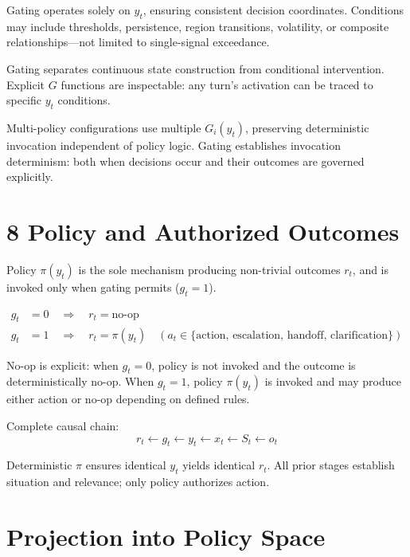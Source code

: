 \documentclass[11pt]{article}
\begin{document}
Gating operates solely on $y_t$, ensuring consistent decision coordinates. Conditions may include thresholds, persistence, region transitions, volatility, or composite relationships---not limited to single-signal exceedance.

Gating separates continuous state construction from conditional intervention. Explicit $G$ functions are inspectable: any turn's activation can be traced to specific $y_t$ conditions.

Multi-policy configurations use multiple $G_i(y_t)$, preserving deterministic invocation independent of policy logic. Gating establishes invocation determinism: both when decisions occur and their outcomes are governed explicitly.

\section*{8 \quad Policy and Authorized Outcomes}
\label{sec:policy}

Policy $\pi(y_t)$ is the sole mechanism producing non-trivial outcomes $r_t$, and is invoked only when gating permits ($g_t = 1$).

\begin{align}
g_t &= 0 \quad \Rightarrow \quad r_t = \mathrm{no\text{-}op} \\
g_t &= 1 \quad \Rightarrow \quad r_t = \pi(y_t) \quad (a_t \in \{\text{action, escalation, handoff, clarification}\})
\end{align}

No-op is explicit: when $g_t = 0$, policy is not invoked and the outcome is deterministically no-op. When $g_t = 1$, policy $\pi(y_t)$ is invoked and may produce either action or no-op depending on defined rules.

Complete causal chain:
\begin{equation}
r_t \leftarrow g_t \leftarrow y_t \leftarrow x_t \leftarrow S_t \leftarrow o_t
\end{equation}

Deterministic $\pi$ ensures identical $y_t$ yields identical $r_t$. All prior stages establish situation and relevance; only policy authorizes action.


\section{Projection into Policy Space}
\label{sec:projection}
\end{document}

